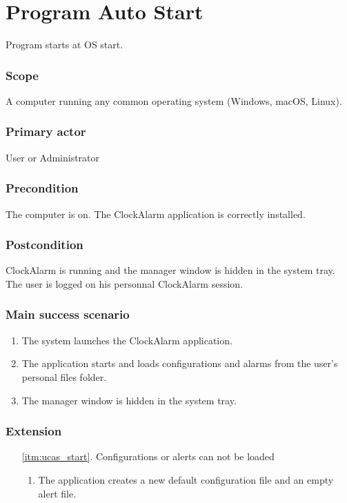\section{Program Auto Start}\label{subsec:usecase_auto_start}

Program starts at OS start.

\subsubsection{Scope}

A computer running any common operating system (Windows, macOS, Linux).

\subsubsection{Primary actor}

User or Administrator

\subsubsection{Precondition}
The computer is on. The ClockAlarm application is correctly installed.

\subsubsection{Postcondition}

ClockAlarm is running and the manager window is hidden in the system tray. The
user is logged on his personnal ClockAlarm session.

\subsubsection{Main success scenario}
\begin{enumerate}
    \item The system launches the ClockAlarm application.
    \item\label{itm:ucas_start} The application starts and loads
        configurations and alarms from the user's personal files folder.
    \item The manager window is hidden in the system tray.
\end{enumerate}

\subsubsection{Extension}
\begin{enumerate}
    \item[\ref{itm:ucas_start}.] Configurations or alerts can not be loaded
    \begin{enumerate}[i]
        \item The application creates a new default configuration file and an
            empty alert file.
    \end{enumerate}
\end{enumerate}
